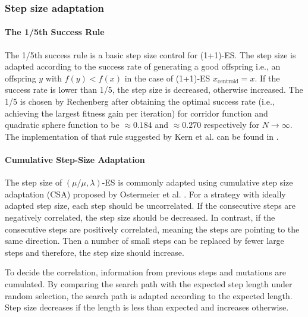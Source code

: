 \subsubsection{Step size adaptation}\label{sssec:step_size_adaptation}\hfill
\paragraph{The 1/5th Success Rule} 
The 1/5th success rule is a basic step size control for (1+1)-ES. The step size is adapted according to the success rate of generating a good offspring i.e., an offspring $y$ with $f(y)<f(x)$ in the case of (1+1)-ES $x_{\text{centroid}}=x$. If the success rate is lower than 1/5, the step size is decreased, otherwise increased. The 1/5 is chosen by Rechenberg \cite{Rechenberg1973} after obtaining the optimal success rate (i.e., achieving the largest fitness gain per iteration) for corridor function and quadratic sphere function to be $\approx 0.184$ and $\approx 0.270$ respectively for $N \rightarrow \infty$. The implementation of that 
rule suggested by Kern et al. can be found in \cite{kern2004learning}.

\paragraph{Cumulative Step-Size Adaptation} 
The step size of $(\mu/\mu,\lambda)$-ES is commonly adapted using cumulative step size adaptation (CSA) proposed by Ostermeier et al. \cite{Ostermeier:1994:DAS:1326675.1326679}. For a strategy with ideally adapted step size, each step should be uncorrelated. If the consecutive steps are negatively correlated, the step size should be decreased. In contrast, if the consecutive steps are positively correlated, meaning the steps are pointing to the same direction. Then a number of small steps can be replaced by fewer large steps and therefore, the step size should increase. 

To decide the correlation, information from previous steps and mutations are cumulated. By comparing the search path with the expected step length under random selection, the search path is adapted according to the expected length. Step size decreases if the length is less than expected and increases otherwise. 

